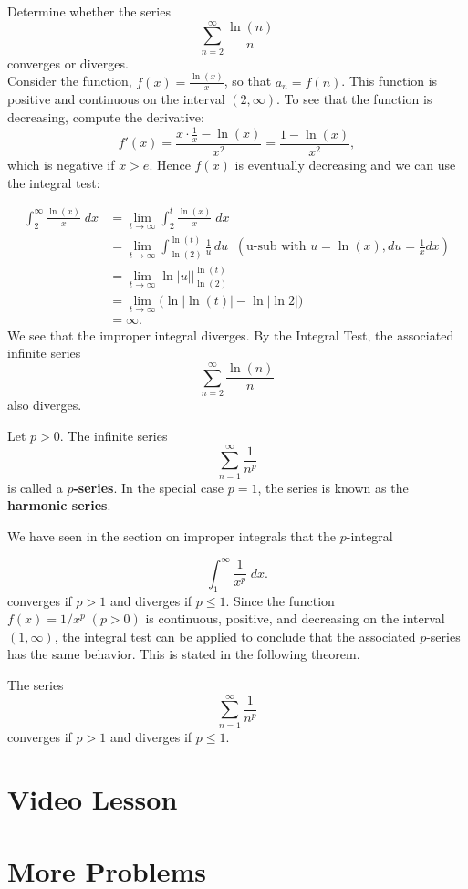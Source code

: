 \documentclass{ximera}
\begin{document}
\begin{example}
Determine whether the series
\[
\sum_{n=2}^\infty \frac{\ln(n)}{n}
\]
converges or diverges.\\
Consider the function, $f(x) = \frac{\ln(x)}{x}$, so that $a_n = f(n)$.
This function is positive and continuous on the interval $(2, \infty)$.
To see that the function is decreasing, compute the derivative:
\[
f'(x) = \frac{x\cdot\frac{1}{x}- \ln(x)}{x^2} = \frac{1-\ln(x)}{x^2},
\]
which is negative if $x > e$. Hence $f(x)$ is eventually decreasing and we can use the integral test:

\begin{align*}
\int_2^\infty \frac{\ln(x)}{x} \; dx &= \lim_{t \to \infty} \int_2^t \frac{\ln(x)}{x} \; dx\\
&= \lim_{t \to \infty} \int_{\ln(2)}^{\ln(t)} \frac{1}{u} \, du \;\; \left(\text{u-sub with $u = \ln(x), du = \frac{1}{x} dx$}\right)\\
&= \lim_{t \to \infty} \ln|u| \bigg|_{\ln(2)}^{\ln(t)}\\
&= \lim_{t \to \infty} \big(\ln|\ln(t)| - \ln|\ln 2|\big)\\
&= \infty.
\end{align*}
We see that the improper integral diverges. By the Integral Test, the associated infinite series
\[
\sum_{n=2}^\infty \frac{\ln(n)}{n}
\]
also diverges.
\end{example}




\begin{definition}[p-series]
Let $p > 0$. The infinite series
\[
\sum_{n=1}^\infty \frac{1}{n^p}
\]
is called a \textbf{$p$-series}. In the special case $p = 1$, the series is known as the \textbf{harmonic series}.
\end{definition}

We have seen in the section on improper integrals that the $p$-integral

\[
\int_1^\infty \frac{1}{x^p} \; dx.
\]
converges if $p > 1$ and diverges if $p \leq 1$.
Since the function $f(x) = 1/x^p \; (p > 0)$ is continuous, positive, and decreasing on the interval $(1, \infty)$,
the integral test can be applied to conclude that the associated $p$-series has the same behavior.  This is stated in the following theorem.


\begin{theorem}[$p$-series]
The series
\[
\sum_{n=1}^\infty \frac{1}{n^p}
\]
converges if $p > 1$ and diverges if $p \leq 1$.
\end{theorem}


\section{Video Lesson}

\begin{center}
\begin{foldable}
\end{foldable}
\end{center}



\section{More Problems}
\end{document}
